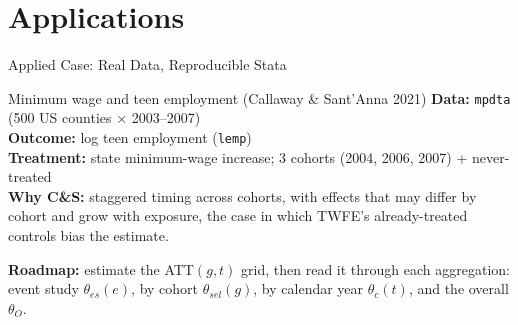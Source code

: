 \documentclass[main.tex]{subfiles}
\begin{document}
\section{Applications}

\begin{frame}{Applied Case: Real Data, Reproducible Stata}

  \begin{block}{Minimum wage and teen employment (Callaway \& Sant'Anna 2021)}
    \textbf{Data:} \texttt{mpdta} (500 US counties $\times$ 2003--2007)\\
    \textbf{Outcome:} log teen employment (\texttt{lemp})\\
    \textbf{Treatment:} state minimum-wage increase; 3 cohorts
    (2004, 2006, 2007) + never-treated\\[4pt]
    \textbf{Why C\&S:} staggered timing across cohorts, with effects that may
    differ by cohort and grow with exposure, the case in which TWFE's
    already-treated controls bias the estimate.
  \end{block}

  \bigskip
  \textbf{Roadmap:} estimate the ATT$(g,t)$ grid, then read it through each
  aggregation: event study $\theta_{es}(e)$, by cohort $\theta_{sel}(g)$,
  by calendar year $\theta_c(t)$, and the overall $\theta_O$.

\end{frame}

\end{document}
